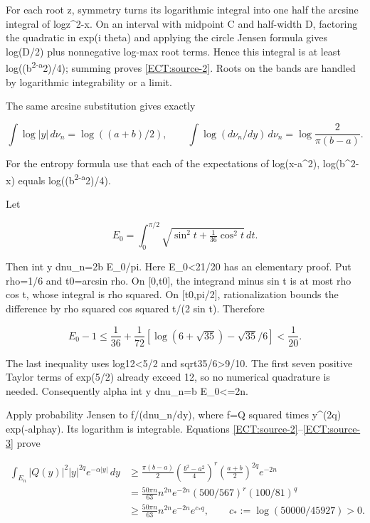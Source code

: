 \documentclass[11pt,a4paper]{article}
\begin{document}
For each root z, symmetry turns its logarithmic integral into one half the arcsine integral of log\textbar z\^{}2-x\textbar. On an interval with midpoint C and half-width D, factoring the quadratic in exp(i theta) and applying the circle Jensen formula gives log(D/2) plus nonnegative log-max root terms. Hence this integral is at least log((b\textsuperscript{2-a}2)/4); summing proves \eqref{ECT:source-2}. Roots on the bands are handled by logarithmic integrability or a limit.

The same arcsine substitution gives exactly

\[
\int\log|y|\,d\nu_n=\log((a+b)/2),\qquad
\int\log(d\nu_n/dy)\,d\nu_n=\log\frac2{\pi(b-a)}.
\tag{ECT9}\label{ECT:source-3}\]

For the entropy formula use that each of the expectations of log(x-a\^{}2), log(b\^{}2-x) equals log((b\textsuperscript{2-a}2)/4).

Let

\[
E_0=\int_0^{\pi/2}\sqrt{\sin^2t+\tfrac1{36}\cos^2t}\,dt.
\tag{ECT10}\label{ECT:eq-10}\]

Then int \textbar y\textbar{} dnu\_n=2b E\_0/pi. Here E\_0\textless21/20 has an elementary proof. Put rho=1/6 and t0=arcsin rho. On {[}0,t0{]}, the integrand minus sin t is at most rho cos t, whose integral is rho squared. On {[}t0,pi/2{]}, rationalization bounds the difference by rho squared cos squared t/(2 sin t). Therefore

\[
E_0-1\le\frac1{36}+\frac1{72}[\log(6+\sqrt{35})-\sqrt{35}/6]<\frac1{20}.
\tag{ECT11}\label{ECT:eq-11}\]

The last inequality uses log12\textless5/2 and sqrt35/6\textgreater9/10. The first seven positive Taylor terms of exp(5/2) already exceed 12, so no numerical quadrature is needed. Consequently alpha int \textbar y\textbar{} dnu\_n=b E\_0\textless=2n.

Apply probability Jensen to f/(dnu\_n/dy), where f=\textbar Q\textbar{} squared times \textbar y\textbar\^{}(2q) exp(-alpha\textbar y\textbar). Its logarithm is integrable. Equations \eqref{ECT:source-2}--\eqref{ECT:source-3} prove

\[
\begin{aligned}
\int_{E_n}|Q(y)|^2|y|^{2q}e^{-\alpha|y|}\,dy
&\ge\frac{\pi(b-a)}2\left(\frac{b^2-a^2}{4}\right)^r
\left(\frac{a+b}{2}\right)^{2q}e^{-2n}\\
&=\frac{50\pi n}{63}n^{2n}e^{-2n}(500/567)^r(100/81)^q\\
&\ge\frac{50\pi n}{63}n^{2n}e^{-2n}e^{c_*q},\qquad
c_*:=\log(50000/45927)>0.
\end{aligned}
\tag{ECT12}\label{ECT:source-4}\]
\end{document}
